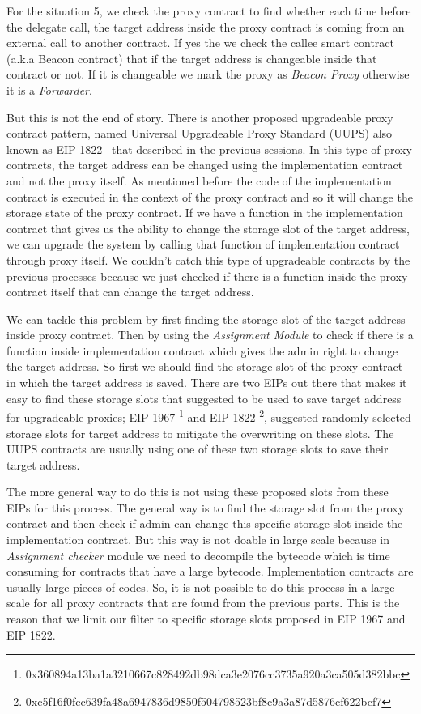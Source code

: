 For the situation 5, we check the proxy contract to find whether each time before the delegate call, the target address inside the proxy contract is coming from an external call to another contract. If yes the we check the callee smart contract (a.k.a Beacon contract) that if the target address is changeable inside that contract or not. If it is changeable we mark the proxy as \textit{Beacon Proxy} otherwise it is a \textit{Forwarder}. 

But this is not the end of story. There is another proposed upgradeable proxy contract pattern, named Universal Upgradeable Proxy Standard (UUPS) also known as EIP-1822~\cite{uupsEIP} that described in the previous sessions. In this type of proxy contracts, the target address can be changed using the implementation contract and not the proxy itself. As mentioned before the code of the implementation contract is executed in the context of the proxy contract and so it will change the storage state of the proxy contract. If we have a function in the implementation contract that gives us the ability to change the storage slot of the target address, we can upgrade the system by calling that function of implementation contract through proxy itself. We couldn't catch this type of upgradeable contracts by the previous processes because we just checked if there is a function inside the proxy contract itself that can change the target address.

We can tackle this problem by first finding the storage slot of the target address inside proxy contract. Then by using the \textit{Assignment Module} to check if there is a function inside implementation contract which gives the admin right to change the target address. So first we should find the storage slot of the proxy contract in which the target address is saved. There are two EIPs out there that makes it easy to find these storage slots that suggested to be used to save target address for upgradeable proxies; EIP-1967 \footnote{0x360894a13ba1a3210667c828492db98dca3e2076cc3735a920a3ca505d382bbc} and EIP-1822 \footnote{0xc5f16f0fcc639fa48a6947836d9850f504798523bf8c9a3a87d5876cf622bcf7}, suggested randomly selected storage slots for target address to mitigate the overwriting on these slots. The UUPS contracts are usually using one of these two storage slots to save their target address.

The more general way to do this is not using these proposed slots from these EIPs for this process. The general way is to find the storage slot from the proxy contract and then check if admin can change this specific storage slot inside the implementation contract. But this way is not doable in large scale because in \textit{Assignment checker} module we need to decompile the bytecode which is time consuming for contracts that have a large bytecode. Implementation contracts are usually large pieces of codes. So, it is not possible to do this process in a large-scale for all proxy contracts that are found from the previous parts. This is the reason that we limit our filter to specific storage slots proposed in EIP 1967 and EIP 1822.

